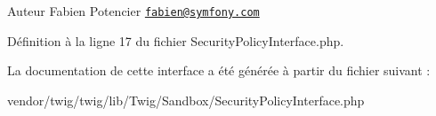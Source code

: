 \begin{DoxyAuthor}{Auteur}
Fabien Potencier \href{mailto:fabien@symfony.com}{\tt fabien@symfony.\+com} 
\end{DoxyAuthor}


Définition à la ligne 17 du fichier Security\+Policy\+Interface.\+php.



La documentation de cette interface a été générée à partir du fichier suivant \+:\begin{DoxyCompactItemize}
\item 
vendor/twig/twig/lib/\+Twig/\+Sandbox/Security\+Policy\+Interface.\+php\end{DoxyCompactItemize}
